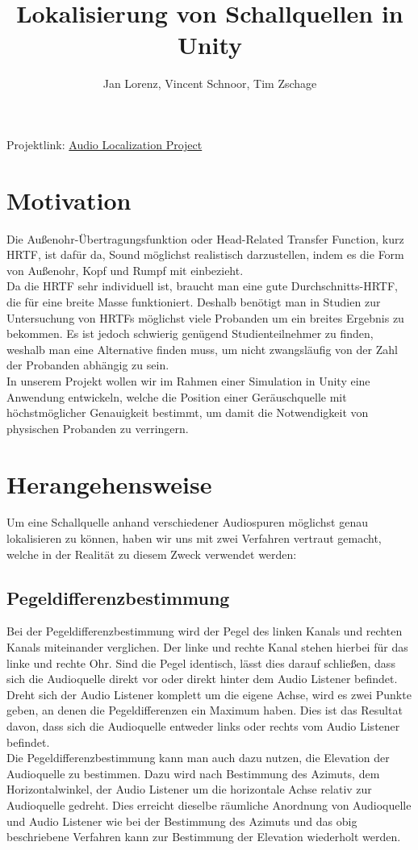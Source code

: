 \documentclass[12pt,a4paper]{article}
\author{Jan Lorenz, Vincent Schnoor, Tim Zschage}
\title{Lokalisierung von Schallquellen in Unity}
\begin{document}
\maketitle
\begin{center}
Projektlink: \href{https://github.com/TheCanadians/AudioLocalization}{Audio Localization Project}
\end{center}

\section{Motivation}
Die Außenohr-Übertragungsfunktion oder Head-Related Transfer Function, kurz HRTF, ist dafür da, Sound möglichst realistisch darzustellen, indem es die Form von Außenohr, Kopf und Rumpf mit einbezieht.\\
Da die HRTF sehr individuell ist, braucht man eine gute Durchschnitts-HRTF, die für eine breite Masse funktioniert. Deshalb benötigt man in Studien zur Untersuchung von HRTFs möglichst viele Probanden um ein breites Ergebnis zu bekommen. Es ist jedoch schwierig genügend Studienteilnehmer zu finden, weshalb man eine Alternative finden muss, um nicht zwangsläufig von der Zahl der Probanden abhängig zu sein.\\
In unserem Projekt wollen wir im Rahmen einer Simulation in Unity eine Anwendung entwickeln, welche die Position einer Geräuschquelle mit höchstmöglicher Genauigkeit bestimmt, um damit die Notwendigkeit von physischen Probanden zu verringern.

\section{Herangehensweise}
Um eine Schallquelle anhand verschiedener Audiospuren möglichst genau lokalisieren zu können, haben wir uns mit zwei Verfahren vertraut gemacht, welche in der Realität zu diesem Zweck verwendet werden:

\subsection{Pegeldifferenzbestimmung}
Bei der Pegeldifferenzbestimmung wird der Pegel des linken Kanals und rechten Kanals miteinander verglichen. Der linke und rechte Kanal stehen hierbei für das linke und rechte Ohr. Sind die Pegel identisch, lässt dies darauf schließen, dass sich die Audioquelle direkt vor oder direkt hinter dem Audio Listener befindet. Dreht sich der Audio Listener komplett um die eigene Achse, wird es zwei Punkte geben, an denen die Pegeldifferenzen ein Maximum haben. Dies ist das Resultat davon, dass sich die Audioquelle entweder links oder rechts vom Audio Listener befindet.\\ 
Die Pegeldifferenzbestimmung kann man auch dazu nutzen, die Elevation der Audioquelle zu bestimmen. Dazu wird nach Bestimmung des Azimuts, dem Horizontalwinkel, der Audio Listener um die horizontale Achse relativ zur Audioquelle gedreht. Dies erreicht dieselbe räumliche Anordnung von Audioquelle und Audio Listener wie bei der Bestimmung des Azimuts und das obig beschriebene Verfahren kann zur Bestimmung der Elevation wiederholt werden. 
\end{document}
